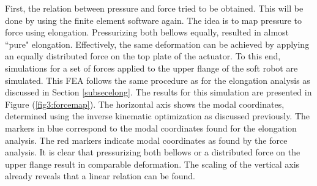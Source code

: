 First, the relation between pressure and force tried to be obtained. This will be done by using the finite element software again. The idea is to map pressure to force using elongation. Pressurizing both bellows equally, resulted in almost ``pure" elongation. Effectively, the same deformation can be achieved by applying an equally distributed force on the top plate of the actuator. To this end, simulations for a set of forces applied to the upper flange of the soft robot are simulated. This FEA follows the same procedure as for the elongation analysis as discussed in Section \ref{subsecelong}. The results for this simulation are presented in Figure (\ref{fig3:forcemap}). The horizontal axis shows the modal coordinates, determined using the inverse kinematic optimization as discussed previously. The markers in blue correspond to the modal coordinates found for the elongation analysis. The red markers indicate modal coordinates as found by the force analysis. It is clear that pressurizing both bellows or a distributed force on the upper flange result in comparable deformation. The scaling of the vertical axis already reveals that a linear relation can be found.


